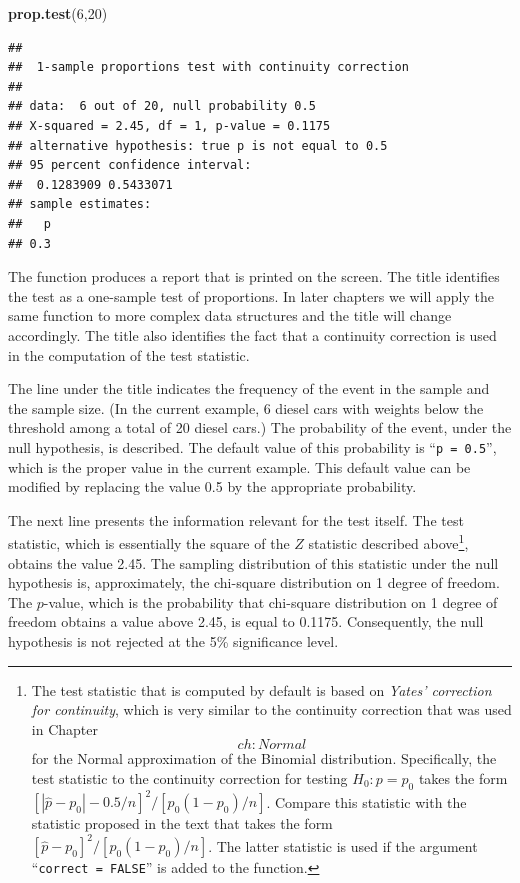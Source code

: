 \documentclass[
]{krantz}
\makeatletter
\newenvironment{Shaded}{\begin{snugshade}}{\end{snugshade}}
\newcommand{\DecValTok}[1]{\textcolor[rgb]{0.00,0.00,0.81}{#1}}
\newcommand{\KeywordTok}[1]{\textcolor[rgb]{0.13,0.29,0.53}{\textbf{#1}}}
\newcommand{\NormalTok}[1]{#1}
\newenvironment{kframe}{%
\medskip{}
\setlength{\fboxsep}{.8em}
 \def\at@end@of@kframe{}%
 \ifinner\ifhmode%
  \def\at@end@of@kframe{\end{minipage}}%
  \begin{minipage}{\columnwidth}%
 \fi\fi%
 \def\FrameCommand##1{\hskip\@totalleftmargin \hskip-\fboxsep
 \colorbox{shadecolor}{##1}\hskip-\fboxsep
     \hskip-\linewidth \hskip-\@totalleftmargin \hskip\columnwidth}%
 \MakeFramed {\advance\hsize-\width
   \@totalleftmargin\z@ \linewidth\hsize
   \@setminipage}}%
 {\par\unskip\endMakeFramed%
 \at@end@of@kframe}
\renewenvironment{Shaded}{\begin{kframe}}{\end{kframe}}
\theoremstyle{definition}
\theoremstyle{definition}
\theoremstyle{definition}
\theoremstyle{remark}
\makeatother
\begin{document}
\begin{Shaded}
\begin{Highlighting}[]
\KeywordTok{prop.test}\NormalTok{(}\DecValTok{6}\NormalTok{,}\DecValTok{20}\NormalTok{)}
\end{Highlighting}
\end{Shaded}

\begin{verbatim}
## 
##  1-sample proportions test with continuity correction
## 
## data:  6 out of 20, null probability 0.5
## X-squared = 2.45, df = 1, p-value = 0.1175
## alternative hypothesis: true p is not equal to 0.5
## 95 percent confidence interval:
##  0.1283909 0.5433071
## sample estimates:
##   p 
## 0.3
\end{verbatim}

The function produces a report that is printed on the screen. The title
identifies the test as a one-sample test of proportions. In later
chapters we will apply the same function to more complex data structures
and the title will change accordingly. The title also identifies the
fact that a continuity correction is used in the computation of the test
statistic.

The line under the title indicates the frequency of the event in the
sample and the sample size. (In the current example, 6 diesel cars with
weights below the threshold among a total of 20 diesel cars.) The
probability of the event, under the null hypothesis, is described. The
default value of this probability is ``\texttt{p\ =\ 0.5}'', which is the proper
value in the current example. This default value can be modified by
replacing the value 0.5 by the appropriate probability.

The next line presents the information relevant for the test itself. The
test statistic, which is essentially the square of the \(Z\) statistic
described above\footnote{The test statistic that is computed by default is based on
  \emph{Yates' correction for continuity}, which is very similar to the
  continuity correction that was used in Chapter~\[ch:Normal\] for the
  Normal approximation of the Binomial distribution. Specifically, the
  test statistic to the continuity correction for testing
  \(H_0:p = p_0\) takes the form
  \([|\hat p - p_0|-0.5/n]^2/[p_0(1-p_0)/n]\). Compare this statistic
  with the statistic proposed in the text that takes the form
  \([\hat p - p_0]^2/[p_0(1-p_0)/n]\). The latter statistic is used if
  the argument ``\texttt{correct\ =\ FALSE}'' is added to the function.}, obtains the value 2.45. The sampling distribution
of this statistic under the null hypothesis is, approximately, the
chi-square distribution on 1 degree of freedom. The \(p\)-value, which is
the probability that chi-square distribution on 1 degree of freedom
obtains a value above 2.45, is equal to 0.1175. Consequently, the null
hypothesis is not rejected at the 5\% significance level.
\end{document}
